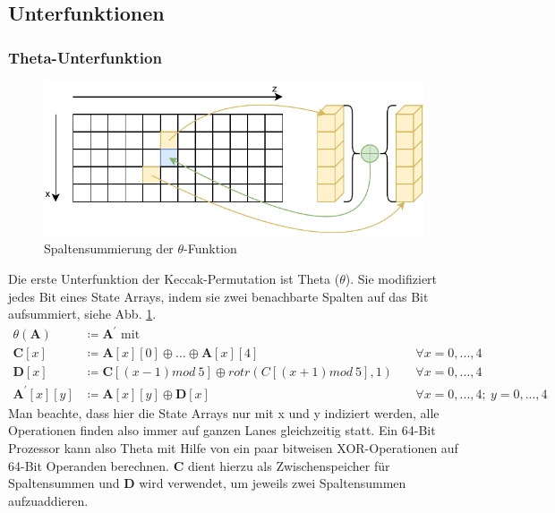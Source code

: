 \subsection{Unterfunktionen}


\subsubsection{Theta-Unterfunktion}
\begin{figure}
    \center
    \includegraphics{images/theta.pdf}
    \caption{Spaltensummierung der $\theta$-Funktion}
    \label{fig:definition_theta}
\end{figure}
Die erste Unterfunktion der Keccak-Permutation ist Theta ($\theta$). Sie modifiziert jedes Bit eines State Arrays, indem sie zwei benachbarte Spalten auf das Bit aufsummiert, siehe Abb. \ref{fig:definition_theta}.
\begin{align*}
    \theta (\textbf{A}) & \coloneq \textbf{A}^\prime \text{ mit } \\
    \textbf{C}[x] & \coloneq \textbf{A}[x][0] \oplus ... \oplus \textbf{A}[x][4] && \forall x = 0,...,4 \\
    \textbf{D}[x] & \coloneq \textbf{C}[(x - 1) mod\ 5] \oplus rotr(C[(x + 1) mod\ 5], 1)\ && \forall x = 0,...,4 \\
    \textbf{A}^\prime[x][y] & \coloneq \textbf{A}[x][y] \oplus \textbf{D}[x]\ && \forall x = 0,...,4;\ y = 0,...,4
\end{align*}
Man beachte, dass hier die State Arrays nur mit x und y indiziert werden, alle Operationen finden also immer auf ganzen Lanes gleichzeitig statt.
Ein 64-Bit Prozessor kann also Theta mit Hilfe von ein paar bitweisen XOR-Operationen auf 64-Bit Operanden berechnen.
\textbf{C} dient hierzu als Zwischenspeicher für Spaltensummen und \textbf{D} wird verwendet, um jeweils zwei Spaltensummen aufzuaddieren.

